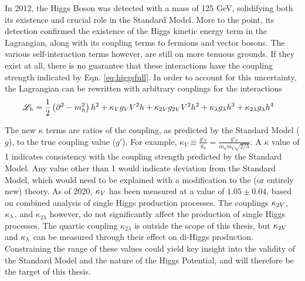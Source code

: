     In 2012, the Higgs Boson was detected with a mass of 125 GeV, solidifying both its existence and crucial role in the Standard Model.
    More to the point, its detection confirmed the existence of the Higgs kinetic energy term in the Lagrangian,
        along with its coupling terms to fermions and vector bosons.
    The various self-interaction terms however, are still on more tenuous grounds.
    If they exist at all, there is no guarantee that these interactions have the coupling strength indicated by Eqn. \ref{eq:higgsfull}.
    In order to account for this uncertainty, the Lagrangian can be rewritten with arbitrary couplings for the interactions
    \begin{equation} \begin{split} \label{eq:higgskappas}
        \mathscr{L}_h &= \frac{1}{2} \left(\partial^2 - m_h^2 \right) h^2
            + \kappa_{V} g_V V^2 h + \kappa_{2V} g_{2V} V^2 h^2
            + \kappa_{\lambda} g_{\lambda} h^3 + \kappa_{2 \lambda} g_{\lambda} h^4
    \end{split} \end{equation}

    The new $\kappa$ terms are ratios of the coupling, as predicted by the Standard Model ($g$), to the true coupling value ($g'$).
    For example, $\kappa_V \equiv \frac{g'_V}{g_V} = \frac{g'_V}{m_h m_V \sqrt{2/\lambda}}$.
    A $\kappa$ value of 1 indicates consistency with the coupling strength predicted by the Standard Model.
    Any value other than 1 would indicate deviation from the Standard Model,
        which would need to be explained with a modification to the (or entirely new) theory.
    As of 2020, $\kappa_{V}$ has been measured at a value of $1.05 \pm 0.04$,
        based on combined analysis of single Higgs production processes\cite{paper:higgs_combined}.
    The couplings $\kappa_{2V}$, $\kappa_{\lambda}$, and $\kappa_{2\lambda}$ however, do not significantly affect the production of single Higgs processes.
    The quartic coupling $\kappa_{2\lambda}$ is outside the scope of this thesis,
        but $\kappa_{2V}$ and $\kappa_{\lambda}$ can be measured through their effect on di-Higgs production.
    Constraining the range of these values could yield key insight into the validity of the Standard Model and the nature of the Higgs Potential,
        and will therefore be the target of this thesis.
